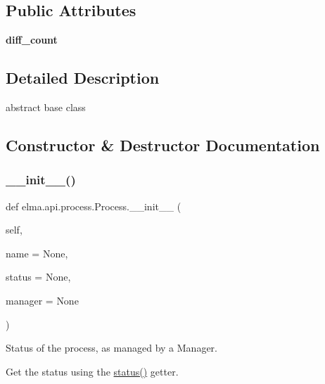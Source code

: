 \subsection*{Public Attributes}
\begin{DoxyCompactItemize}
\item 
\mbox{\label{classelma_1_1api_1_1process_1_1Process_a37f72d81499fbbf8a3beaeff06d62202}} 
{\bfseries diff\+\_\+count}
\end{DoxyCompactItemize}


\subsection{Detailed Description}
abstract base class 

\subsection{Constructor \& Destructor Documentation}
\mbox{\label{classelma_1_1api_1_1process_1_1Process_a7a539964a64e16cc8bc42e15124df35e}} 
\subsubsection{\texorpdfstring{\+\_\+\+\_\+init\+\_\+\+\_\+()}{\_\_init\_\_()}}
{\footnotesize\ttfamily def elma.\+api.\+process.\+Process.\+\_\+\+\_\+init\+\_\+\+\_\+ (\begin{DoxyParamCaption}\item[{}]{self,  }\item[{}]{name = {\ttfamily None},  }\item[{}]{status = {\ttfamily None},  }\item[{}]{manager = {\ttfamily None} }\end{DoxyParamCaption})}



Status of the process, as managed by a Manager. 

Get the status using the \hyperlink{classelma_1_1api_1_1process_1_1Process_a6dc2725cd3d032b3ec80e0fc6c52a994}{status()} getter. 

